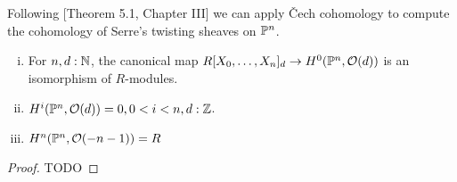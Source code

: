 
Following \cite{Hartshorne}[Theorem 5.1, Chapter III] we can apply \v{C}ech cohomology to compute
the cohomology of Serre's twisting sheaves on $\mathbb{P}^n$.

\begin{theorem}
  \begin{enumerate}[(i)]
  \item For $n,d:\mathbb{N}$, the canonical map $R[X_0,\dots,X_n]_d\to H^0(\mathbb{P}^n,\mathcal O(d))$ is an isomorphism of $R$-modules.
  \item $H^i(\mathbb{P}^n,\mathcal O(d))=0, 0<i<n, d:\mathbb{Z}$.
  \item $H^n(\mathbb{P}^n,\mathcal O(-n-1))=R$
  \end{enumerate}
\end{theorem}

\begin{proof}
  TODO
\end{proof}